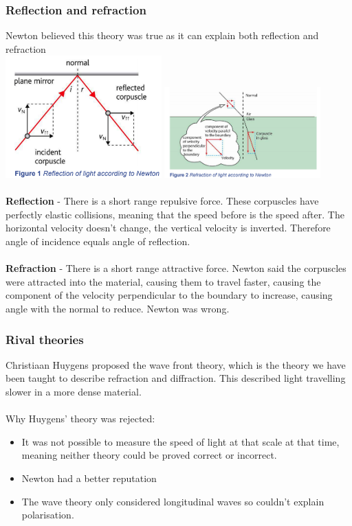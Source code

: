 \documentclass[12pt]{article}
\begin{document}
\subsubsection{Reflection and refraction}
Newton believed this theory was true as it can explain both reflection and refraction\\
\includegraphics[width=6cm]{reflection.png}
\includegraphics[width=6cm]{refraction.png}\\
\\
\textbf{Reflection} - There is a short range repulsive force. These corpuscles have perfectly elastic collisions, meaning that the speed before is the speed after. The horizontal velocity doesn't change, the vertical velocity is inverted. Therefore angle of incidence equals angle of reflection.\\
\\
\textbf{Refraction} - There is a short range attractive force. Newton said the corpuscles were attracted into the material, causing them to travel faster, causing the component of the velocity perpendicular to the boundary to increase, causing angle with the normal to reduce. Newton was wrong.
\subsubsection{Rival theories}
Christiaan Huygens proposed the wave front theory, which is the theory we have been taught to describe refraction and diffraction. This described light travelling slower in a more dense material.\\
\\
Why Huygens' theory was rejected:
\begin{itemize}
\item It was not possible to measure the speed of light at that scale at that time, meaning neither theory could be proved correct or incorrect.
\item Newton had a better reputation
\item The wave theory only considered longitudinal waves so couldn't explain polarisation.
\end{itemize}
\end{document}
